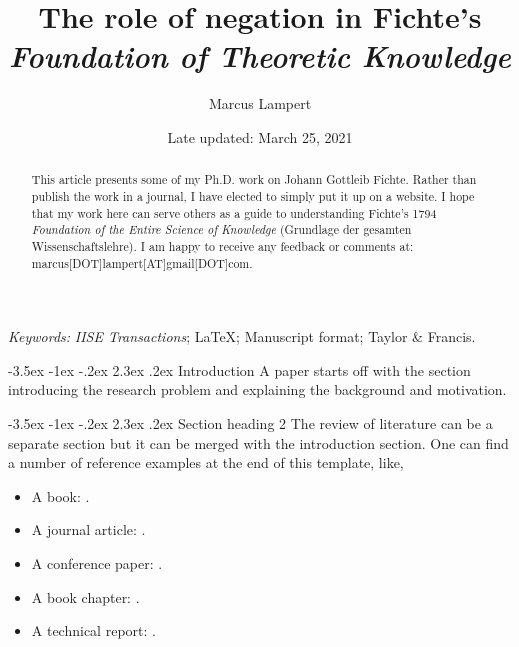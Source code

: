 \documentclass[11pt]{article}
\makeatletter
\renewcommand\section{\@startsection {section}{1}{\z@}%
                                       {-3.5ex \@plus -1ex \@minus -.2ex}%
                                       {2.3ex \@plus.2ex}%
                                       {\normalfont\fontfamily{phv}\fontsize{16}{19}\bfseries}}
\makeatother
\begin{document}
		
		\def\spacingset#1{\renewcommand{\baselinestretch}%
			{#1}\small\normalsize} \spacingset{1}
			\title{\bf The role of negation in Fichte's \\
			\emph{Foundation of Theoretic Knowledge} }
			\author{Marcus Lampert}
			\date{Late updated: March 25, 2021}
			\maketitle
		\bigskip
			
\begin{abstract}
This article presents some of my Ph.D. work on Johann Gottleib Fichte.  Rather than publish the work in a journal, I have elected to simply put it up on a website.  I hope that my work here can serve others as a guide to understanding Fichte's 1794 \textit{Foundation of the Entire Science of Knowledge} (Grundlage der gesamten Wissenschaftslehre). I am happy to receive any feedback or comments at: marcus[DOT]lampert[AT]gmail[DOT]com.
\end{abstract}
		
\noindent%
{\it Keywords:} \emph{IISE Transactions}; \LaTeX; Manuscript format; Taylor \& Francis.

\spacingset{1.5} %


\section{Introduction} \label{s:intro}
A paper starts off with the section introducing the research problem and explaining the background and motivation.

\section{Section heading 2} \label{s:sec2}
The review of literature can be a separate section but it can be merged with the introduction section. One can find a number of reference examples at the end of this template, like,
\begin{itemize}
\item A book: \cite{Hastie2009}.
\item A journal article: \cite{Byon2013}.
\item A conference paper: \cite{Breunig2000}.
\item A book chapter: \cite{Yang2010}.
\item A technical report: \cite{Kelley2007}.
\end{itemize}
\end{document}
